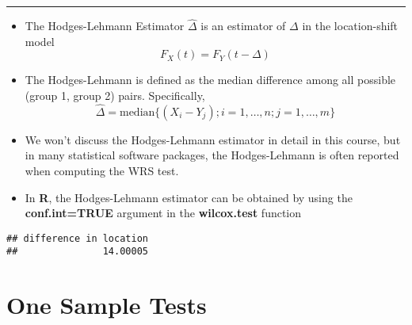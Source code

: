 \documentclass[]{book}
\newenvironment{Shaded}{\begin{snugshade}}{\end{snugshade}}
\newcommand{\CommentTok}[1]{\textcolor[rgb]{0.56,0.35,0.01}{\textit{#1}}}
\newcommand{\DataTypeTok}[1]{\textcolor[rgb]{0.13,0.29,0.53}{#1}}
\newcommand{\DecValTok}[1]{\textcolor[rgb]{0.00,0.00,0.81}{#1}}
\newcommand{\KeywordTok}[1]{\textcolor[rgb]{0.13,0.29,0.53}{\textbf{#1}}}
\newcommand{\NormalTok}[1]{#1}
\newcommand{\OperatorTok}[1]{\textcolor[rgb]{0.81,0.36,0.00}{\textbf{#1}}}
\newcommand{\OtherTok}[1]{\textcolor[rgb]{0.56,0.35,0.01}{#1}}
\newcommand{\StringTok}[1]{\textcolor[rgb]{0.31,0.60,0.02}{#1}}
\begin{document}
\begin{center}\rule{0.5\linewidth}{\linethickness}\end{center}

\begin{itemize}
\item
  The Hodges-Lehmann Estimator \(\hat{\Delta}\) is an estimator of \(\Delta\) in the location-shift model
  \begin{equation}
  F_{X}(t) = F_{Y}(t - \Delta) \nonumber
  \end{equation}
\item
  The Hodges-Lehmann is defined as the median difference among all possible (group 1, group 2) pairs.
  Specifically,
  \begin{equation}
  \hat{\Delta} = \textrm{median}\{ (X_{i} - Y_{j}); i=1,\ldots,n; j=1,\ldots,m \} \nonumber
  \end{equation}
\item
  We won't discuss the Hodges-Lehmann estimator in detail in this course, but in
  many statistical software packages, the
  Hodges-Lehmann is often reported when computing the WRS test.
\item
  In \textbf{R}, the Hodges-Lehmann estimator can be obtained by using the \textbf{conf.int=TRUE}
  argument in the \textbf{wilcox.test} function
\end{itemize}

\begin{Shaded}
\end{Shaded}

\begin{verbatim}
## difference in location 
##               14.00005
\end{verbatim}

\hypertarget{one-sample-tests}{%
\section{One Sample Tests}\label{one-sample-tests}}
\end{document}
